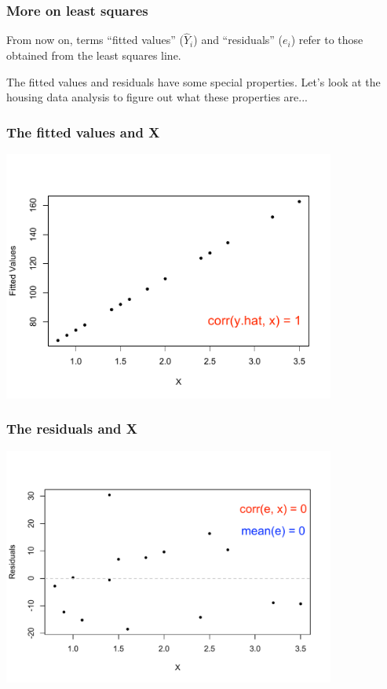 \documentclass{beamer}
\newcommand{\bo}[1]{\textcolor{burntorange}{#1}}
\newcommand{\bl}{\color{lightblue}}
\newcommand{\bk}{\color{black}}
\newcommand{\sk}{\vspace{.5cm}}
\begin{document}
\begin{frame}
\frametitle{More on least squares}

From now on,  terms \bl``fitted values''  ($\hat{Y}_i$) \bk
and \bl ``residuals'' ($e_i$) \bk refer to those obtained 
from the least squares line. 

\sk

\sk The fitted values and residuals have some \bo{special properties}.
Let's look at the housing data analysis to figure out 
what these properties are...


\end{frame}

\begin{frame}
\frametitle{The fitted values and X}

\hspace*{-3mm}\includegraphics[width=4.3in]{figures/fittedVx}

\end{frame}


\begin{frame}
\frametitle{The residuals and X}

\hspace*{-3mm}\includegraphics[width=4.3in]{figures/eVx}

\end{frame}
\end{document}
